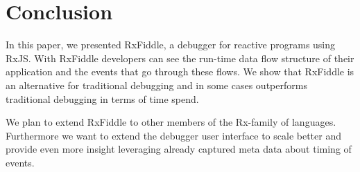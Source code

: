 \section{Conclusion}
In this paper, we presented RxFiddle, a debugger for reactive programs using RxJS. With RxFiddle developers can see the run-time data flow structure of their application and the events that go through these flows. We show that RxFiddle is an alternative for traditional debugging and in some cases outperforms traditional debugging in terms of time spend.

We plan to extend RxFiddle to other members of the Rx-family of languages. Furthermore we want to extend the debugger user interface to scale better and provide even more insight leveraging already captured meta data about timing of events.